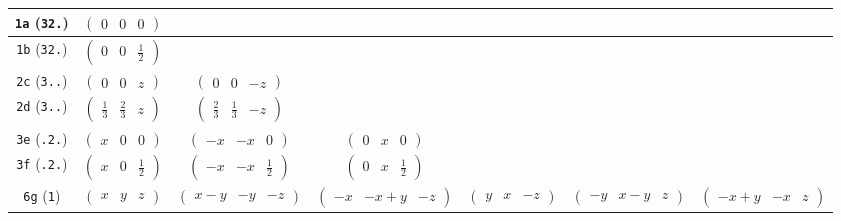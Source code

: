 \documentclass[fleqn,9pt,landscape]{jsarticle}
\begin{document}
\begin{center}
\begin{longtable}{ccccccc}
{\tt 1a} ({\tt 32.}) & $ \begin{pmatrix} 0 & 0 & 0 \end{pmatrix} $ & $  $ & $  $ & $  $ & $  $ & $  $ \\ \hline
{\tt 1b} ({\tt 32.}) & $ \begin{pmatrix} 0 & 0 & \frac{1}{2} \end{pmatrix} $ & $  $ & $  $ & $  $ & $  $ & $  $ \\ \hline
{\tt 2c} ({\tt 3..}) & $ \begin{pmatrix} 0 & 0 & z \end{pmatrix} $ & $ \begin{pmatrix} 0 & 0 & - z \end{pmatrix} $ & $  $ & $  $ & $  $ & $  $ \\ \hline
{\tt 2d} ({\tt 3..}) & $ \begin{pmatrix} \frac{1}{3} & \frac{2}{3} & z \end{pmatrix} $ & $ \begin{pmatrix} \frac{2}{3} & \frac{1}{3} & - z \end{pmatrix} $ & $  $ & $  $ & $  $ & $  $ \\ \hline
{\tt 3e} ({\tt .2.}) & $ \begin{pmatrix} x & 0 & 0 \end{pmatrix} $ & $ \begin{pmatrix} - x & - x & 0 \end{pmatrix} $ & $ \begin{pmatrix} 0 & x & 0 \end{pmatrix} $ & $  $ & $  $ & $  $ \\ \hline
{\tt 3f} ({\tt .2.}) & $ \begin{pmatrix} x & 0 & \frac{1}{2} \end{pmatrix} $ & $ \begin{pmatrix} - x & - x & \frac{1}{2} \end{pmatrix} $ & $ \begin{pmatrix} 0 & x & \frac{1}{2} \end{pmatrix} $ & $  $ & $  $ & $  $ \\ \hline
{\tt 6g} ({\tt 1}) & $ \begin{pmatrix} x & y & z \end{pmatrix} $ & $ \begin{pmatrix} x - y & - y & - z \end{pmatrix} $ & $ \begin{pmatrix} - x & - x + y & - z \end{pmatrix} $ & $ \begin{pmatrix} y & x & - z \end{pmatrix} $ & $ \begin{pmatrix} - y & x - y & z \end{pmatrix} $ & $ \begin{pmatrix} - x + y & - x & z \end{pmatrix} $ \\
\end{longtable}
\end{center}
\end{document}
